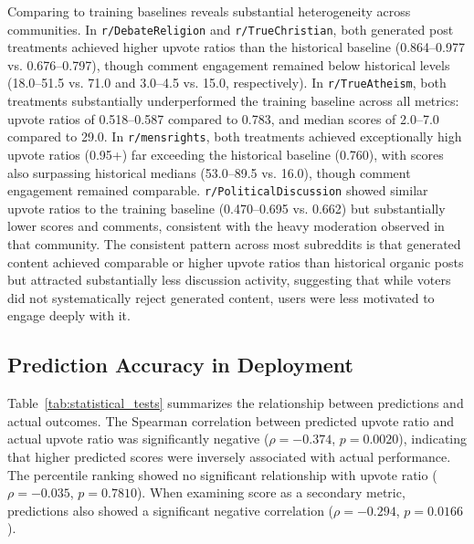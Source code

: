 Comparing to training baselines reveals substantial heterogeneity across communities. In \verb!r/DebateReligion! and \verb!r/TrueChristian!, both generated post treatments achieved higher upvote ratios than the historical baseline (0.864--0.977 vs. 0.676--0.797), though comment engagement remained below historical levels (18.0--51.5 vs. 71.0 and 3.0--4.5 vs. 15.0, respectively). In \verb!r/TrueAtheism!, both treatments substantially underperformed the training baseline across all metrics: upvote ratios of 0.518--0.587 compared to 0.783, and median scores of 2.0--7.0 compared to 29.0. In \verb!r/mensrights!, both treatments achieved exceptionally high upvote ratios (0.95+) far exceeding the historical baseline (0.760), with scores also surpassing historical medians (53.0--89.5 vs. 16.0), though comment engagement remained comparable. \verb!r/PoliticalDiscussion! showed similar upvote ratios to the training baseline (0.470--0.695 vs. 0.662) but substantially lower scores and comments, consistent with the heavy moderation observed in that community. The consistent pattern across most subreddits is that generated content achieved comparable or higher upvote ratios than historical organic posts but attracted substantially less discussion activity, suggesting that while voters did not systematically reject generated content, users were less motivated to engage deeply with it.

\subsection{Prediction Accuracy in Deployment}
\label{subsec:prediction_accuracy_live}

Table~\ref{tab:statistical_tests} summarizes the relationship between predictions and actual outcomes. The Spearman correlation between predicted upvote ratio and actual upvote ratio was significantly negative ($\rho = -0.374$, $p = 0.0020$), indicating that higher predicted scores were inversely associated with actual performance. The percentile ranking showed no significant relationship with upvote ratio ($\rho = -0.035$, $p = 0.7810$). When examining score as a secondary metric, predictions also showed a significant negative correlation ($\rho = -0.294$, $p = 0.0166$).

